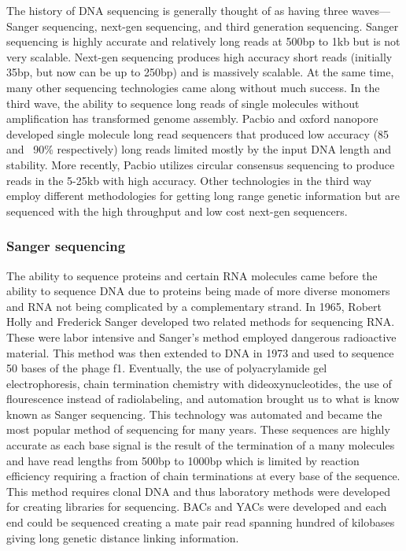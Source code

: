 \par{
The history of DNA sequencing is generally thought of as having three waves---Sanger sequencing, next-gen sequencing, and third generation sequencing. Sanger sequencing is highly accurate and relatively long reads at 500bp to 1kb but is not very scalable. Next-gen sequencing produces high accuracy short reads (initially 35bp, but now can be up to 250bp) and is massively scalable. At the same time, many other sequencing technologies came along without much success. In the third wave, the ability to sequence long reads of single molecules without amplification has transformed genome assembly. Pacbio and oxford nanopore developed single molecule long read sequencers that produced low accuracy (85 and ~90\% respectively) long reads limited mostly by the input DNA length and stability. More recently, Pacbio utilizes circular consensus sequencing to produce reads in the 5-25kb with high accuracy. Other technologies in the third way employ different methodologies for getting long range genetic information but are sequenced with the high throughput and low cost next-gen sequencers.
}

\subsubsection{Sanger sequencing}\label{section:sanger}

\par{
The ability to sequence proteins and certain RNA molecules came before the ability to sequence DNA due to proteins being made of more diverse monomers and RNA not being complicated by a complementary strand\cite{aminoacidsequence}\cite{sequenceofsequencers}. In 1965, Robert Holly and Frederick Sanger developed two related methods for sequencing RNA\cite{Holly1}\cite{Sanger1}. These were labor intensive and Sanger's method employed dangerous radioactive material. This method was then extended to DNA in 1973 and used to sequence 50 bases of the phage f1\cite{Sanger2}. Eventually, the use of polyacrylamide gel electrophoresis, chain termination chemistry with dideoxynucleotides, the use of flourescence instead of radiolabeling, and automation brought us to what is know known as Sanger sequencing\cite{Sanger3}. This technology was automated and became the most popular method of sequencing for many years\cite{Hunkapiller1991}. These sequences are highly accurate as each base signal is the result of the termination of a many molecules and have read lengths from 500bp to 1000bp which is limited by reaction efficiency requiring a fraction of chain terminations at every base of the sequence. This method requires clonal DNA and thus laboratory methods were developed for creating libraries for sequencing. BACs and YACs \cite{BACsYACs} were developed and each end could be sequenced creating a mate pair read spanning hundred of kilobases giving long genetic distance linking information.
}

